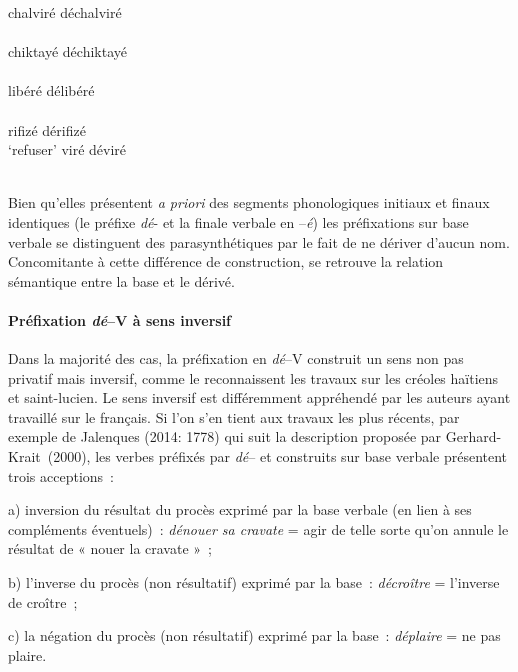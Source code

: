 \documentclass[output=paper]{langsci/langscibook}
\begin{document}
\ex \label{ex:VilloingDeglas:52}
      \ea chalviré \textrightarrow{} déchalviré\\
        \\
      \ex  chiktayé \textrightarrow{} déchiktayé\\
        \\
      \ex  libéré \textrightarrow{} délibéré\\
        \\
        \ex  rifizé \textrightarrow{} dérifizé\\
         \glt `refuser'
      \ex  viré \textrightarrow{} déviré\\
        \\
\z\z

Bien qu'elles présentent \emph{a priori} des segments phonologiques
initiaux et finaux identiques (le préfixe \emph{dé}- et la finale
verbale en --\emph{é}) les préfixations sur base verbale se distinguent
des parasynthétiques par le fait de ne dériver d'aucun nom. Concomitante
à cette différence de construction, se retrouve la relation sémantique
entre la base et le dérivé.

\paragraph{Préfixation \emph{dé}--V à sens
inversif}\label{préfixation-dé-v-uxe0-sens-inversif}

Dans la majorité des cas, la préfixation en \emph{dé}--V construit un
sens non pas privatif mais inversif, comme le reconnaissent les travaux
sur les créoles haïtiens et saint-lucien. Le sens inversif est
différemment appréhendé par les auteurs ayant travaillé sur le français.
Si l'on s'en tient aux travaux les plus récents, par exemple de
Jalenques (2014: 1778) qui suit la description proposée par
Gerhard-Krait~(2000), les verbes préfixés par \emph{dé}-- et construits
sur base verbale présentent trois acceptions~:

a) inversion du résultat du procès exprimé par la base verbale (en lien
à ses compléments éventuels)~: \emph{dénouer sa cravate }= agir de telle
sorte qu'on annule le résultat de « nouer la cravate »~;

b) l'inverse du procès (non résultatif) exprimé par la base~:
\emph{décroître }= l'inverse de croître~;

c) la négation du procès (non résultatif) exprimé par la base~:
\emph{déplaire }= ne pas plaire.
\end{document}
